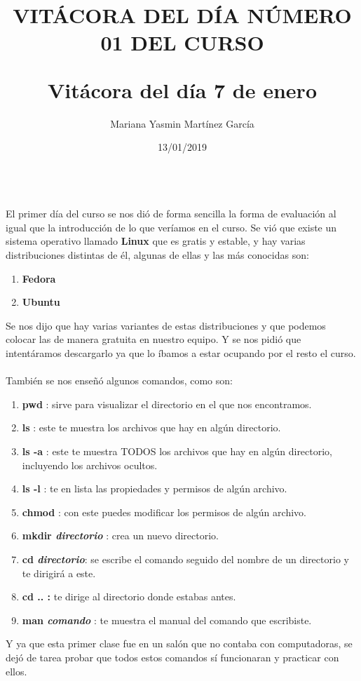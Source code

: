 \documentclass[letterpaper, 12pt, twoside]{article}
\title{\Huge\item\color{red}\textbf {VITÁCORA DEL DÍA NÚMERO 01 DEL CURSO}}
\author{Mariana Yasmin Martínez García}
\date{13/01/2019}
\begin{document}
	\maketitle
	\begin{figure}
		\centering
		\caption{}
		\label{fig:1}
	\end{figure}
	
	
	\newpage
	
	\title{\huge\textbf{Vitácora del día 7 de enero\\}} \\
	El primer día del curso se nos dió de forma sencilla la forma de evaluación al igual que la introducción de lo que veríamos en el curso.
	Se vió que existe un sistema operativo llamado \textbf{Linux} que es gratis y estable, y hay varias distribuciones distintas de él, algunas de ellas y las más conocidas son:
	\begin{enumerate}
		\item\textbf{Fedora}
		\item\textbf{Ubuntu}
	\end{enumerate} 
    Se nos dijo que hay varias variantes de estas distribuciones y que podemos colocar las de manera gratuita en nuestro equipo. Y se nos pidió que intentáramos descargarlo ya que lo íbamos a estar ocupando por el resto el curso.\\ \\
   
También se nos enseñó algunos comandos, como son: 
	\begin{enumerate}
		\item \textbf{\large pwd }: sirve para visualizar el directorio en el que nos encontramos.
		\item \textbf{\large ls }: este te muestra los archivos que hay en algún directorio.
		\item \textbf{\large ls -a }: este te muestra TODOS los archivos que hay en algún directorio, incluyendo los archivos ocultos.
		\item \textbf{\large ls -l }: te en lista las propiedades y permisos de algún archivo.
		\item \textbf{\large chmod }: con este puedes modificar los permisos de algún archivo.
		\item \textbf{\large mkdir \textit{directorio} }: crea un nuevo directorio.
		\item \textbf{\large cd \textit{directorio}}: se escribe el comando seguido del nombre de un directorio y te dirigirá a este.
		\item \textbf{\large cd .. :} te dirige al directorio donde estabas antes.
		\item \textbf{\large man \textit{comando} }: te muestra el manual del comando que escribiste.	
	\end{enumerate}
    Y ya que esta primer clase fue en un salón que no contaba con computadoras, se dejó de tarea probar que todos estos comandos sí funcionaran y practicar con ellos.

	
	
	
\end{document}
